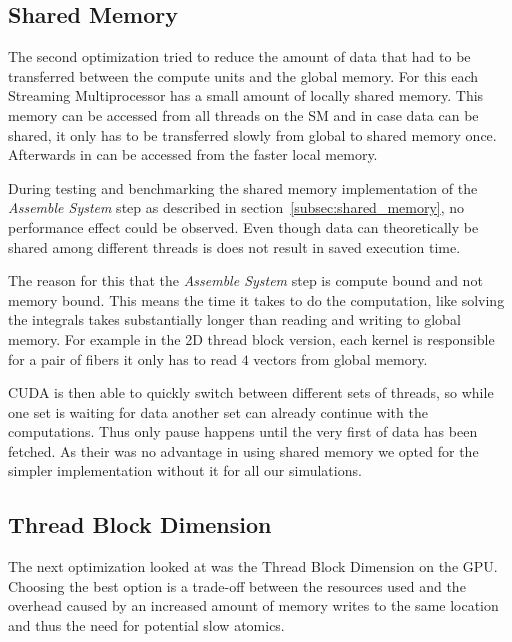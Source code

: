 \documentclass[a4paper,11pt]{kth-mag}
\begin{document}
\subsection{Shared Memory}
\label{subsec:bench_shared_memory}

The second optimization tried to reduce the amount of data that had to be transferred between the compute units and the global memory. For this each Streaming Multiprocessor has a small amount of locally shared memory. This memory can be accessed from all threads on the SM and in case data can be shared, it only has to be transferred slowly from global to shared memory once. Afterwards in can be accessed from the faster local memory.

During testing and benchmarking the shared memory implementation of the \emph{Assemble System} step as described in section~\ref{subsec:shared_memory}, no performance effect could be observed. Even though data can theoretically be shared among different threads is does not result in saved execution time.

The reason for this that the \emph{Assemble System} step is compute bound and not memory bound. This means the time it takes to do the computation, like solving the integrals takes substantially longer than reading and writing to global memory. For example in the 2D thread block version, each kernel is responsible for a pair of fibers it only has to read $4$ vectors from global memory.

CUDA is then able to quickly switch between different sets of threads, so while one set is waiting for data another set can already continue with the computations. Thus only pause happens until the very first of data has been fetched. As their was no advantage in using shared memory we opted for the simpler implementation without it for all our simulations.

\subsection{Thread Block Dimension}

The next optimization looked at was the Thread Block Dimension on the GPU. Choosing the best option is a trade-off between the resources used and the overhead caused by an increased amount of memory writes to the same location and thus the need for potential slow atomics.
\end{document}
